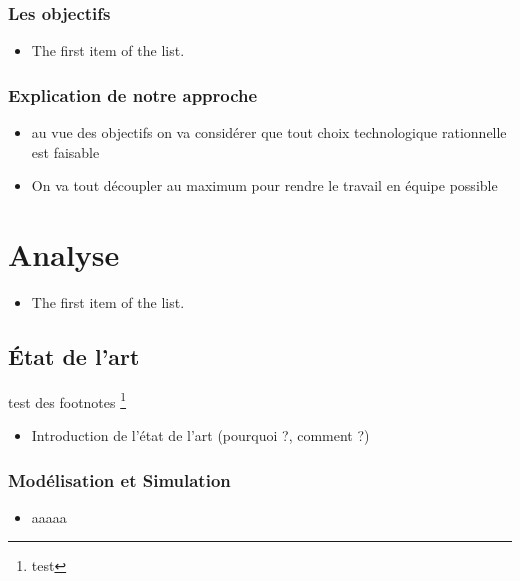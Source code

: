 \documentclass{rapport_stage}
\begin{document}
\section{Les objectifs}

\begin{itemize}[label=$\bullet$]
  \item The first item of the list.
\end{itemize}

\section{Explication de notre approche}

\begin{itemize}[label=$\bullet$]
  \item au vue des objectifs on va considérer que tout choix technologique rationnelle est faisable
  \item On va tout découpler au maximum pour rendre le travail en équipe possible
\end{itemize}




\part{Analyse}

\begin{itemize}[label=$\bullet$]
  \item The first item of the list.
\end{itemize}

\chapter{État de l'art}


test des footnotes \footnote{test}
\begin{itemize}[label=$\bullet$]
  \item Introduction de l'état de l'art (pourquoi ?, comment ?)
\end{itemize}

\section{Modélisation et Simulation}

\begin{itemize}[label=$\bullet$]
  \item aaaaa
\end{itemize}
\end{document}
